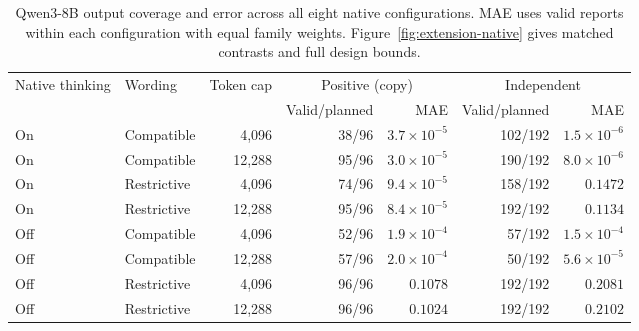 \begin{table}[t]
\centering
{\small\setlength{\tabcolsep}{4pt}
\begin{tabular*}{\textwidth}{@{\extracolsep{\fill}}llrrrrr@{}}
\toprule
Native thinking & Wording & Token cap & \multicolumn{2}{c}{Positive (copy)} & \multicolumn{2}{c}{Independent} \\
\cmidrule(lr){4-5}\cmidrule(l){6-7}
 & & & Valid/planned & MAE & Valid/planned & MAE \\
\midrule
On & Compatible & 4,096 & 38/96 & $3.7\times10^{-5}$ & 102/192 & $1.5\times10^{-6}$ \\
On & Compatible & 12,288 & 95/96 & $3.0\times10^{-5}$ & 190/192 & $8.0\times10^{-6}$ \\
On & Restrictive & 4,096 & 74/96 & $9.4\times10^{-5}$ & 158/192 & $0.1472$ \\
On & Restrictive & 12,288 & 95/96 & $8.4\times10^{-5}$ & 192/192 & $0.1134$ \\
\midrule
Off & Compatible & 4,096 & 52/96 & $1.9\times10^{-4}$ & 57/192 & $1.5\times10^{-4}$ \\
Off & Compatible & 12,288 & 57/96 & $2.0\times10^{-4}$ & 50/192 & $5.6\times10^{-5}$ \\
Off & Restrictive & 4,096 & 96/96 & $0.1078$ & 192/192 & $0.2081$ \\
Off & Restrictive & 12,288 & 96/96 & $0.1024$ & 192/192 & $0.2102$ \\
\bottomrule
\end{tabular*}
}
\caption{Qwen3-8B output coverage and error across all eight native configurations. MAE uses valid reports within each configuration with equal family weights. Figure~\ref{fig:extension-native} gives matched contrasts and full design bounds.}
\label{tab:extension-native-configurations}
\end{table}
